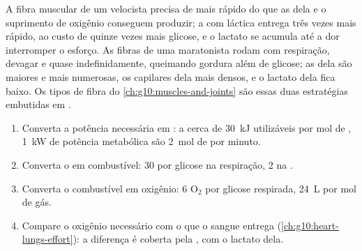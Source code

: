 \begin{example}\label{ex:g12:respiration-fermentation:muscle}
A fibra muscular de um velocista precisa de  mais rápido do que as
 dela e o suprimento de oxigênio conseguem produzir; a
 com  láctica entrega  três vezes mais rápido,
ao custo de quinze vezes mais glicose, e o lactato se acumula até a dor
interromper o esforço. As fibras de uma maratonista rodam com
respiração, devagar e quase indefinidamente, queimando gordura além de
glicose; as  dela são maiores e mais numerosas, os
capilares dela mais densos, e o lactato dela fica baixo. Os tipos de
fibra do \cref{ch:g10:muscles-and-joints} são essas duas estratégias
embutidas em .
\end{example}

\begin{method}\label{met:g12:respiration-fermentation:budget}
\begin{enumerate}
  \item Converta a potência necessária em : a cerca de \qty{30}{kJ}
        utilizáveis por mol de , \qty{1}{kW} de potência metabólica
        são \qty{2}{mol} de  por minuto.
  \item Converta o  em combustível: 30  por glicose na
        respiração, 2 na .
  \item Converta o combustível em oxigênio: 6 $\mathrm{O_2}$ por
        glicose respirada, \qty{24}{L} por mol de gás.
  \item Compare o oxigênio necessário com o que o sangue entrega
        (\cref{ch:g10:heart-lungs-effort}): a diferença é coberta pela
        , com o lactato dela.
\end{enumerate}
\end{method}

